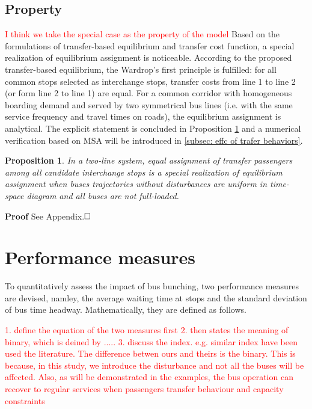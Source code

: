 \documentclass[smallextended]{svjour3}       %
\newtheorem{mypro}[proposition]{Proposition}
\begin{document}
\begin{Abstract}
\subsection{Property}
\textcolor{red}{I think we take the special case as the property of the model}
Based on the formulations of transfer-based equilibrium and transfer cost function, a special realization of equilibrium assignment is noticeable.
According to the proposed transfer-based equilibrium, the Wardrop's first principle is fulfilled: 
for all common stops selected as interchange stops, transfer costs from line 1 to line 2 (or form line 2 to line 1) are equal.
For a common corridor with homogeneous boarding demand and served by two symmetrical bus lines (i.e. with the same service frequency and travel times on roads), the equilibrium assignment is analytical.
The explicit statement is concluded in Proposition \ref{pro:equal assignment} and a numerical verification based on MSA will be introduced in \ref{subsec: effc of trafer behaviors}. 
\begin{mypro}\label{pro:equal assignment}
    In a two-line system, equal assignment of transfer passengers among all candidate interchange stops is a special realization of equilibrium assignment when buses trajectories without disturbances are uniform in time-space diagram and all buses are not full-loaded. 
\end{mypro}
\noindent \textbf{Proof} See Appendix.$\hfill\square$ 

\section{Performance measures} \label{PM}
To quantitatively assess the impact of bus bunching, two performance measures are devised, namley, the average waiting time at stops and the standard deviation of bus time headway. Mathematically, they are defined as follows. 

\textcolor{red}{
    1. define the equation of the two measures first 
    2. then states the meaning of binary, which is deined by .....
    3. discuss the index. e.g. similar index have been used the literature. The difference betwen ours and theirs is the binary. This is because, in this study, we introduce the disturbance and not all the buses will be affected. Also, as will be demonstrated in the examples,  the bus operation can recover to regular services when passengers transfer behaviour and capacity constraints
    }


\end{Abstract}
\end{document}

